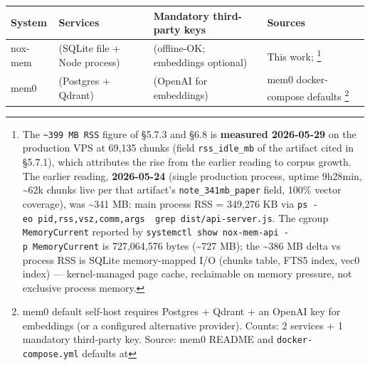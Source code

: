 \documentclass[
]{article}
\newcounter{none} %
\begin{document}
{\def\LTcaptype{none} %
\begin{longtable}[]{@{}
  >{\raggedright\arraybackslash}p{}
  >{\raggedleft\arraybackslash}p{}
  >{\raggedleft\arraybackslash}p{}
  >{\raggedright\arraybackslash}p{}@{}}
\toprule\noalign{}
\begin{minipage}[b]{\linewidth}\raggedright
System
\end{minipage} & \begin{minipage}[b]{\linewidth}\raggedleft
Services
\end{minipage} & \begin{minipage}[b]{\linewidth}\raggedleft
Mandatory third-party keys
\end{minipage} & \begin{minipage}[b]{\linewidth}\raggedright
Sources
\end{minipage} \\
\midrule\noalign{}
\endhead
\bottomrule\noalign{}
\endlastfoot
nox-mem & 1 (SQLite file + Node process) & 0 (offline-OK; embeddings
optional) & This work; \footnote{The
  \texttt{\textasciitilde{}399\ MB\ RSS} figure of §5.7.3 and §6.8 is
  \textbf{measured 2026-05-29} on the production VPS at 69,135 chunks
  (field \texttt{rss\_idle\_mb} of the artifact cited in §5.7.1), which
  attributes the rise from the earlier reading to corpus growth. The
  earlier reading, \textbf{2026-05-24} (single production process,
  uptime 9h28min, \textasciitilde62k chunks live per that artifact's
  \texttt{note\_341mb\_paper} field, 100\% vector coverage), was
  \textasciitilde341 MB: main process RSS = 349,276 KB via
  \texttt{ps\ -eo\ pid,rss,vsz,comm,args\ \textbar{}\ grep\ dist/api-server.js}.
  The cgroup \texttt{MemoryCurrent} reported by
  \texttt{systemctl\ show\ nox-mem-api\ -p\ MemoryCurrent} is
  727,064,576 bytes (\textasciitilde727 MB); the \textasciitilde386 MB
  delta vs process RSS is SQLite memory-mapped I/O (chunks table, FTS5
  index, vec0 index) --- kernel-managed page cache, reclaimable on
  memory pressure, not exclusive process memory.} \\
mem0 & 2 (Postgres + Qdrant) & 1 (OpenAI for embeddings) & mem0
docker-compose defaults \footnote{mem0 default self-host requires
  Postgres + Qdrant + an OpenAI key for embeddings (or a configured
  alternative provider). Counts: 2 services + 1 mandatory third-party
  key. Source: mem0 README and \texttt{docker-compose.yml} defaults at
}
\end{longtable}}
\end{document}
